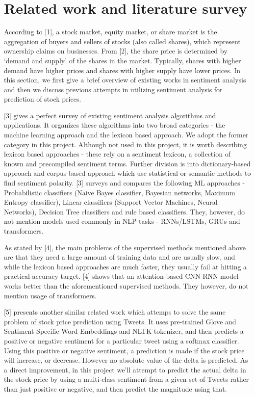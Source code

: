 \documentclass{article}
\begin{document}
\section{Related work and literature survey}
    According to [1], a stock market, equity market, or share market is the aggregation of buyers and sellers of stocks (also called shares), which represent ownership claims on businesses. From [2], the share price is determined by `demand and supply' of the shares in the market. Typically, shares with higher demand have higher prices and shares with higher supply have lower prices. In this section, we first give a brief overview of existing works in sentiment analysis and then we discuss previous attempts in utilizing sentiment analysis for prediction of stock prices. 

    [3] gives a perfect survey of existing sentiment analysis algorithms and applications. It organizes these algorithms into two broad categories - the machine learning approach and the lexicon based approach. We adopt the former category in this project. Although not used in this project, it is worth describing lexicon based approaches - these rely on a sentiment lexicon, a collection of known and precompiled sentiment terms. Further division is into dictionary-based approach and corpus-based approach which use statistical or semantic methods to find sentiment polarity. [3] surveys and compares the following ML approaches - Probabilistic classifiers (Naive Bayes classifier, Bayesian networks, Maximum Entropy classifier), Linear classifiers (Support Vector Machines, Neural Networks), Decision Tree classifiers and rule based classifiers. They, however, do not mention models used commonly in NLP tasks - RNNs/LSTMs, GRUs and transformers. 

    As stated by [4], the main problems of the supervised methods mentioned above are that they need a large amount of training data and are usually slow, and while the lexicon based approaches are much faster, they usually fail at hitting a practical accuracy target. [4] shows that an attention based CNN-RNN model works better than the aforementioned supervised methods. They however, do not mention usage of transformers.

    [5] presents another similar related work which attemps to solve the same problem of stock price prediction using Tweets. It uses pre-trained Glove and Sentiment-Specific Word Embeddings and NLTK tokenizer, and then predicts a positive or negative sentiment for a particular tweet using a softmax classifier. Using this positive or negative sentiment, a prediction is made if the stock price will increase, or decrease. However no absolute value of the delta is predicted. As a direct improvement, in this project we'll attempt to predict the actual delta in the stock price by using a multi-class sentiment from a given set of Tweets rather than just positive or negative, and then predict the magnitude using that.
\end{document}
